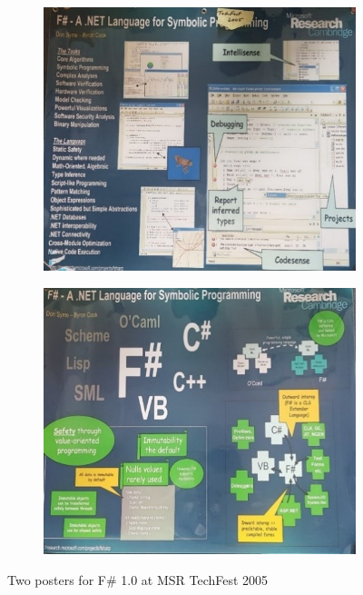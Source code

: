 \documentclass[acmsmall]{acmart}\settopmatter{}
\begin{document}
\begin{figure}
  \centering
  \begin{subfigure}[b]{0.47\linewidth}
    \includegraphics[width=\linewidth]{fig2a.jpg}
  \end{subfigure}
  \begin{subfigure}[b]{0.47\linewidth}
    \includegraphics[width=\linewidth]{fig2b.jpg}
  \end{subfigure}
  \caption{Two posters for F\# 1.0 at MSR TechFest 2005}
  \label{fig:fig2}
\end{figure}
\end{document}
